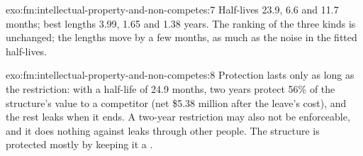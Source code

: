 \begin{solution}{exo:fm:intellectual-property-and-non-competes:7}
Half-lives 23.9, 6.6 and 11.7 months; best lengths 3.99, 1.65 and 1.38 years. The ranking of the three kinds is unchanged; the lengths move by
a few months, as much as the noise in the fitted half-lives.
\end{solution}

\begin{solution}{exo:fm:intellectual-property-and-non-competes:8}
Protection lasts only as long as the restriction: with a half-life of 24.9 months, two years protect 56\% of the structure's value to a competitor
(net \$5.38 million after the leave's cost), and the rest leaks when it ends. A two-year restriction may also not be enforceable, and it does
nothing against leaks through other people. The structure is protected mostly by keeping it a .
\end{solution}


